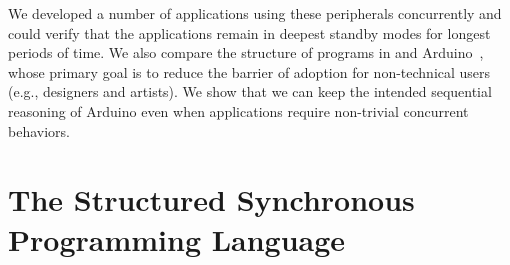 We developed a number of applications using these peripherals concurrently and
could verify that the applications remain in deepest standby modes for longest
periods of time.
%
We also compare the structure of programs in \CEU and
Arduino~\cite{arduino.book}, whose primary goal is to reduce the barrier of
adoption for non-technical users (e.g., designers and artists).
We show that we can keep the intended sequential reasoning of Arduino even when
applications require non-trivial concurrent behaviors.



\section{The Structured Synchronous Programming Language \CEU}

\begin{comment}
- structured programming
- lexical scope

In summary:

Reactive: code executes in reactions to events

Synchronous: reactions run to completion, i.e., there's no implicit preemption or real parallelism (this avoids explicit synchronization: locks, queues, etc)

Structured: programs use structured control mechanisms, such as "await" (to suspend a line of execution), and "par" (to combine multiple awaiting lines of execution)

Structured programming avoids deep nesting of callbacks letting you write programs in direct/sequential style. In addition, when a line of execution is aborted, all allocated resources are safely released.

In comparison to FRP/dataflow, it is more imperative supporting sequences/loops/conditionals/parallels. The notion of (multiple) program counter is explicit. Also, everything is lexically scoped, there's no GC involved.

In comparison to promises/futures, it provides lexical parallel constructs, allowing the branches to share local variables and, more importantly, supporting safe abortion of code (with the "par/or").
\end{comment}

